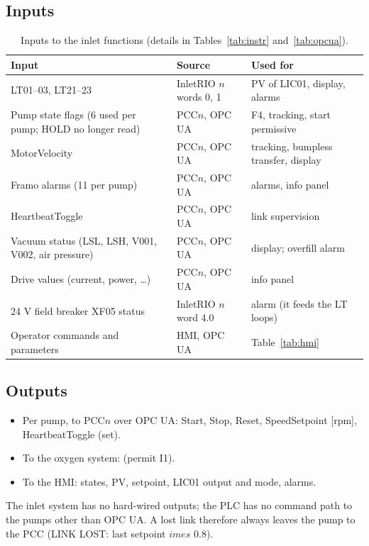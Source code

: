 \documentclass[11pt,a4paper]{article}
\begin{document}
\subsection{Inputs}
\begin{table}[htbp]
\centering\small
\caption{Inputs to the inlet functions (details in Tables~\ref{tab:instr} and~\ref{tab:opcua}).}
\label{tab:inputs}
\begin{tabularx}{\textwidth}{@{}P{46mm}P{34mm}L@{}}
\toprule
Input & Source & Used for \\
\midrule
LT01--03, LT21--23 & InletRIO $n$ words 0, 1 & PV of LIC01, display, alarms \\
Pump state flags (6 used per pump; HOLD no longer read) & PCC$n$, OPC UA & F4, tracking, start permissive \\
MotorVelocity & PCC$n$, OPC UA & tracking, bumpless transfer, display \\
Framo alarms (11 per pump) & PCC$n$, OPC UA & alarms, info panel \\
HeartbeatToggle & PCC$n$, OPC UA & link supervision \\
Vacuum status (LSL, LSH, V001, V002, air pressure) & PCC$n$, OPC UA & display; overfill alarm \\
Drive values (current, power, \ldots) & PCC$n$, OPC UA & info panel \\
24 V field breaker XF05 status & InletRIO $n$ word 4.0 & alarm (it feeds the LT loops) \\
Operator commands and parameters & HMI, OPC UA & Table~\ref{tab:hmi} \\
\bottomrule
\end{tabularx}
\end{table}

\subsection{Outputs}
\begin{itemize}[nosep]
  \item Per pump, to PCC$n$ over OPC UA: Start, Stop, Reset, SpeedSetpoint [rpm], HeartbeatToggle (set).
  \item To the oxygen system:  (permit I1).
  \item To the HMI: states, PV, setpoint, LIC01 output and mode, alarms.
\end{itemize}
The inlet system has no hard-wired outputs; the PLC has no command path to the pumps other than
OPC UA. A lost link therefore always leaves the pump to the PCC (LINK LOST: last setpoint $	imes$ 0.8).
\end{document}

